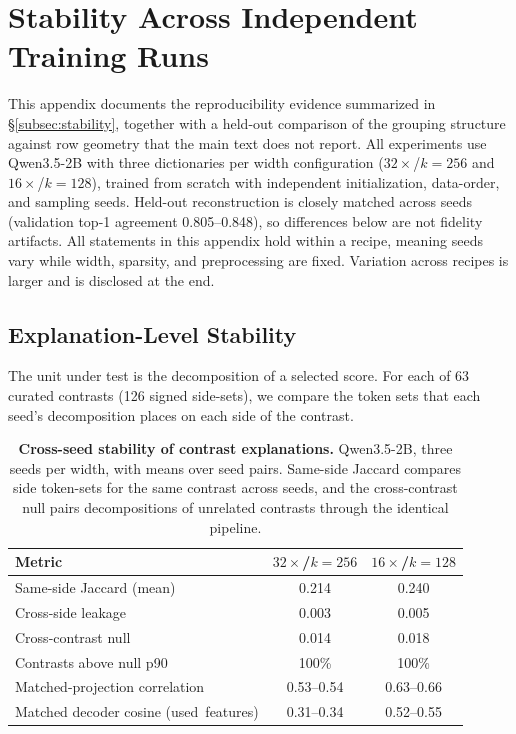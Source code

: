 \section{Stability Across Independent Training Runs}
\label{app:basis-stability}

This appendix documents the reproducibility evidence summarized in
\S\ref{subsec:stability}, together with a held-out comparison of the
grouping structure against row geometry that the main text does not
report. All experiments use
Qwen3.5-2B with three dictionaries per width configuration
(\(32\times\)/\(k{=}256\) and \(16\times\)/\(k{=}128\)), trained from
scratch with independent initialization, data-order, and sampling seeds.
Held-out reconstruction is closely matched across seeds (validation
top-1 agreement 0.805--0.848), so
differences below are not fidelity artifacts. All statements in this
appendix hold within a recipe, meaning seeds vary while width, sparsity,
and preprocessing are fixed. Variation across recipes is larger and is
disclosed at the end.

\subsection{Explanation-Level Stability}
\label{app:basis-stability-explanations}

The unit under test is the decomposition of a selected score. For each
of 63 curated contrasts (126 signed side-sets), we compare the token
sets that each seed's decomposition places on each side of the contrast.

\begin{table}[!tbp]
\caption{\textbf{Cross-seed stability of contrast explanations.}
Qwen3.5-2B, three seeds per width, with means over seed pairs. Same-side
Jaccard compares side token-sets for the same contrast across seeds, and the
cross-contrast null pairs decompositions of unrelated contrasts through
the identical pipeline.}
\label{tab:app-cross-seed-stability}
\centering
\footnotesize
\setlength{\tabcolsep}{4pt}
\renewcommand{\arraystretch}{1.08}
\begin{tabularx}{\linewidth}{@{}>{\RaggedRight\arraybackslash}Xcc@{}}
\toprule
Metric & \(32\times\)/\(k{=}256\) & \(16\times\)/\(k{=}128\) \\
\midrule
Same-side Jaccard (mean) & 0.214 & 0.240 \\
Cross-side leakage & 0.003 & 0.005 \\
Cross-contrast null & 0.014 & 0.018 \\
Contrasts above null p90 & 100\% & 100\% \\
Matched-projection correlation & 0.53--0.54 & 0.63--0.66 \\
Matched decoder cosine \mbox{(used features)} & 0.31--0.34 & 0.52--0.55 \\
\bottomrule
\end{tabularx}
\end{table}

